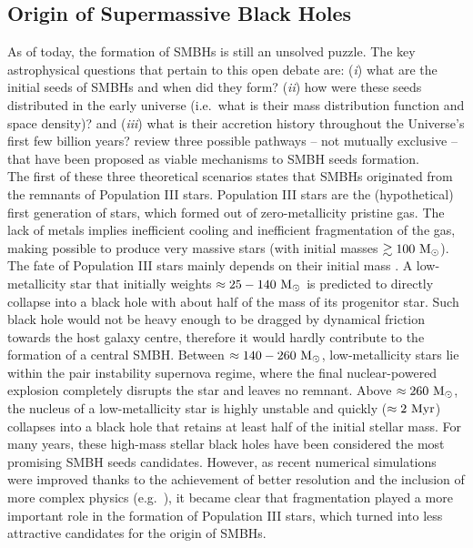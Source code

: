 \subsection{Origin of Supermassive Black Holes}
As of today, the formation of SMBHs is still an unsolved puzzle. 
The key astrophysical questions that pertain to this open debate are: 
(\emph{i}) what are the initial seeds of SMBHs and when did they form? 
(\emph{ii}) how were these seeds distributed in the early universe 
(i.e.~what is their mass distribution function and space density)? 
and (\emph{iii}) what is their accretion history throughout the Universe's first few billion years? 
\cite{volonteribellovary2012} review three possible pathways -- not mutually exclusive -- 
that have been proposed as viable mechanisms to SMBH seeds formation. \\

The first of these three theoretical scenarios states that SMBHs originated from the remnants of Population III stars. 
Population III stars are the (hypothetical) first generation of stars, which formed out of zero-metallicity pristine gas. 
The lack of metals implies inefficient cooling and inefficient fragmentation of the gas, 
making possible to produce very massive stars (with initial masses $\gtrsim 100~\rm M_\odot$). 
The fate of Population III stars mainly depends on their initial mass \citep{heger2003}. 
A low-metallicity star that initially weights $\approx 25 - 140~\rm M_\odot$ is predicted to directly collapse into a black hole 
with about half of the mass of its progenitor star. 
Such black hole would not be heavy enough to be dragged by dynamical friction towards the host galaxy centre, 
therefore it would hardly contribute to the formation of a central SMBH. 
Between $\approx 140 - 260~\rm M_\odot$, low-metallicity stars lie within the pair instability supernova regime, 
where the final nuclear-powered explosion completely disrupts the star and leaves no remnant. 
Above $\approx 260~\rm M_\odot$, the nucleus of a low-metallicity star is highly unstable 
and quickly ($\approx 2~\rm Myr$) collapses into a black hole that retains at least half of the initial stellar mass. 
For many years, these high-mass stellar black holes have been considered the most promising SMBH seeds candidates. 
However, as recent numerical simulations were improved 
thanks to the achievement of better resolution and the inclusion of more complex physics 
(e.g.~\citealt{turk2009,greif2011,clark2011,stacy2012}), 
it became clear that fragmentation played a more important role in the formation of Population III stars, 
which turned into less attractive candidates for the origin of SMBHs. \\

